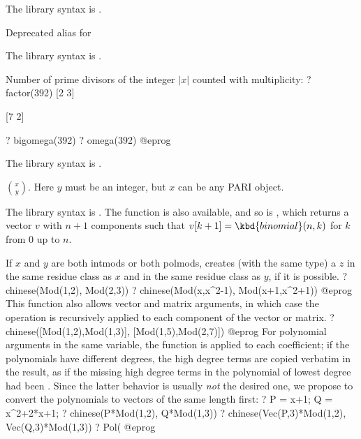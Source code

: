 The library syntax is .

\label{se:bezout}
Deprecated alias for 

The library syntax is .

\label{se:bigomega}
Number of prime divisors of the integer $|x|$ counted with
multiplicity:
\bprog
? factor(392)
[2 3]

[7 2]

? bigomega(392)
? omega(392)
@eprog

The library syntax is .

\label{se:binomial}
 $\binom{x}{y}$.
Here $y$ must be an integer, but $x$ can be any PARI object.

The library syntax is .
The function
 is also available, and so is
, which returns a vector $v$
with $n+1$ components such that $v[k+1] = \kbd{binomial}(n,k)$ for $k$ from
$0$ up to $n$.

\label{se:chinese}
If $x$ and $y$ are both intmods or both polmods, creates (with the same
type) a $z$ in the same residue class as $x$ and in the same residue class as
$y$, if it is possible.
\bprog
? chinese(Mod(1,2), Mod(2,3))
? chinese(Mod(x,x^2-1), Mod(x+1,x^2+1))
@eprog\noindent
This function also allows vector and matrix arguments, in which case the
operation is recursively applied to each component of the vector or matrix.
\bprog
? chinese([Mod(1,2),Mod(1,3)], [Mod(1,5),Mod(2,7)])
@eprog\noindent
For polynomial arguments in the same variable, the function is applied to each
coefficient; if the polynomials have different degrees, the high degree terms
are copied verbatim in the result, as if the missing high degree terms in the
polynomial of lowest degree had been . Since the latter
behavior is usually \emph{not} the desired one, we propose to convert the
polynomials to vectors of the same length first:
\bprog
 ? P = x+1; Q = x^2+2*x+1;
 ? chinese(P*Mod(1,2), Q*Mod(1,3))
 ? chinese(Vec(P,3)*Mod(1,2), Vec(Q,3)*Mod(1,3))
 ? Pol(%
@eprog


